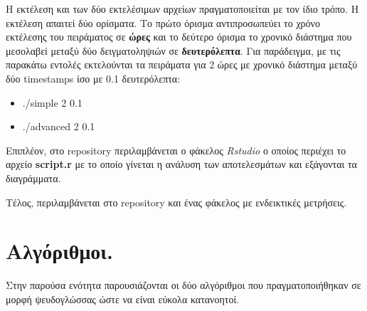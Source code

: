 \documentclass[12pt, a4paper]{article}
\begin{document}
\justify
Η εκτέλεση και των δύο εκτελέσιμων αρχείων πραγματοποιείται με τον ίδιο τρόπο. Η εκτέλεση απαιτεί δύο ορίσματα. Το πρώτο όρισμα αντιπροσωπεύει το χρόνο εκτέλεσης του πειράματος σε \textbf{ώρες} και το δεύτερο όρισμα το χρονικό διάστημα που μεσολαβεί μεταξύ δύο δειγματοληψιών σε \textbf{δευτερόλεπτα}. Για παράδειγμα, με τις παρακάτω εντολές εκτελούνται τα πειράματα για 2 ώρες με χρονικό διάστημα μεταξύ δύο \textlatin{timestamps} ίσο με 0.1 δευτερόλεπτα:
\begin{itemize}
  \item \textlatin{./simple 2 0.1}
  \item \textlatin{./advanced 2 0.1}
\end{itemize}

\justify
Επιπλέον, στο \textlatin{repository} περιλαμβάνεται ο φάκελος \textit{\textlatin{Rstudio}} ο οποίος περιέχει το αρχείο \textlatin{\textbf{script.r}} με το οποίο γίνεται η ανάλυση των αποτελεσμάτων και εξάγονται τα διαγράμματα.

\justify
Τέλος, περιλαμβάνεται στο repository και ένας φάκελος με ενδεικτικές μετρήσεις.

\section{Αλγόριθμοι.}
Στην παρούσα ενότητα παρουσιάζονται οι δύο αλγόριθμοι που πραγματοποιήθηκαν σε μορφή ψευδογλώσσας ώστε να είναι εύκολα κατανοητοί.
\end{document}
